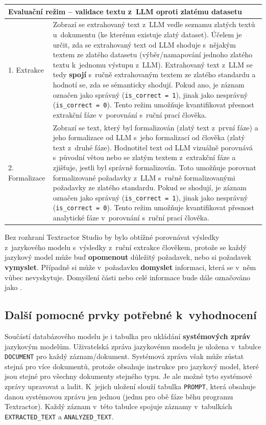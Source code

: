 \documentclass[czech, bc, kiv, he, iso690numb, pdf]{fasthesis}
\begin{document}
\begin{center}
\begin{longtable}{@{} l >{\RaggedRight\arraybackslash}p{\dimexpr\textwidth-4.5cm\relax} @{}}
\multicolumn{2}{l}{\textbf{Evaluační režim -- validace textu z~LLM oproti zlatému datasetu}} \\ \midrule
1. Extrakce & Zobrazí se extrahovaný text z~LLM vedle seznamu zlatých textů u~dokumentu (ke kterému existuje zlatý dataset). Účelem je určit, zda se extrahovaný text od LLM shoduje s~nějakým textem ze zlatého datasetu (výběr/namapování jednoho zlatého textu k~jednomu výstupu z~LLM). Extrahovaný text z~LLM se tedy \textbf{spojí} s~ručně extrahovaným textem ze zlatého standardu a hodnotí se, zda se sémanticky shodují. Pokud ano, je záznam označen jako správný (\verb"is_correct = 1"), jinak jako nesprávný (\verb"is_correct = 0"). Tento režim umožňuje kvantifikovat přesnost extrakční fáze v~porovnání s~ruční prací člověka. \\
2. Formalizace & Zobrazí se text, který byl formalizován (zlatý text z~první fáze) a jeho formalizace od LLM s~jeho formalizací od člověka (zlatý text z~druhé fáze). Hodnotitel text od LLM vizuálně porovnává s~původní větou nebo se zlatým textem z~extrakční fáze a zjišťuje, jestli byl správně formalizován. Toto umožňuje porovnat formalizované požadavky z~LLM s~ručně formalizovanými požadavky ze zlatého standardu. Pokud se shodují, je záznam označen jako správný (\verb"is_correct = 1"), jinak jako nesprávný (\verb"is_correct = 0"). Tento režim umožňuje kvantifikovat přesnost analytické fáze v~porovnání s~ruční prací člověka. \\
\end{longtable}
\end{center}

Bez rozhraní Textractor Studio by bylo obtížné porovnávat výsledky z~jazykového modelu s~výsledky z~ruční extrakce člověkem, protože se každý jazykový model může buď \textbf{opomenout} důležitý požadavek, nebo si požadavek \textbf{vymyslet}. Případně si může v~požadavku \textbf{domyslet} informaci, která se v~něm vůbec nevyskytuje. Domyšlení části nebo celé informace bude dále označováno jako .


\subsection{Další pomocné prvky potřebné k~vyhodnocení}
Součástí databázového modelu je i tabulka pro ukládání \textbf{systémových zpráv} jazykovým modelům. Uživatelská zpráva jazykovému modelu je uložena v~tabulce \verb"DOCUMENT" pro každý záznam/dokument. Systémová zpráva však může zůstat stejná pro více dokumentů, protože obsahuje instrukce pro jazykový model, které jsou stejné pro všechny dokumenty stejného typu. Je ale možné tyto systémové zprávy upravovat a ladit. K~jejich uložení slouží tabulka \verb"PROMPT", která obsahuje danou systémovou zprávu jen jednou (jednu pro obě fáze běhu programu Textractor). Každý záznam v~této tabulce spojuje záznamy v~tabulkách \verb"EXTRACTED_TEXT" a \verb"ANALYZED_TEXT".
\end{document}
